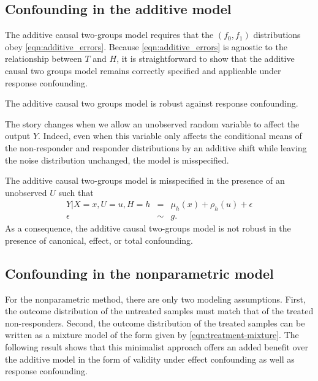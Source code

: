 \subsection{Confounding in the additive model}
\label{subsec:confounding:additive}

The additive causal two-groups model requires that the $(f_0, f_1)$ distributions obey \cref{eqn:additive_errors}. Because \cref{eqn:additive_errors} is agnostic to the relationship between $T$ and $H$, it is straightforward to show that the additive causal two groups model remains correctly specified and applicable under response confounding.
\begin{proposition}
\label{prop:compliance-confounding-ac2g}
The additive causal two groups model is robust against response confounding.
\end{proposition}

The story changes when we allow an unobserved random variable to affect the output $Y$. Indeed, even when this variable only affects the conditional means of the non-responder and responder distributions by an additive shift while leaving the noise distribution unchanged, the model is misspecified.

\begin{proposition}
\label{prop:latent-nonrobust-ac2g}
The additive causal two-groups model is misspecified in the presence of an unobserved $U$ such that 
\begin{align*}
Y | X=x, U=u, H=h &=& \mu_{h}(x) + \rho_{h}(u) + \epsilon  \\
\epsilon &\sim& g.
\end{align*}
As a consequence, the additive causal two-groups model is not robust in the presence of canonical, effect, or total confounding.
\end{proposition}


\subsection{Confounding in the nonparametric model}
\label{subsec:confounding:nonparametric}


For the nonparametric method, there are only two modeling assumptions. First, the outcome distribution of the untreated samples must match that of the treated non-responders. Second, the outcome distribution of the treated samples can be written as a mixture model of the form given by \cref{eqn:treatment-mixture}.
The following result shows that this minimalist approach offers an added benefit over the additive model in the form of validity under effect confounding as well as response confounding.

